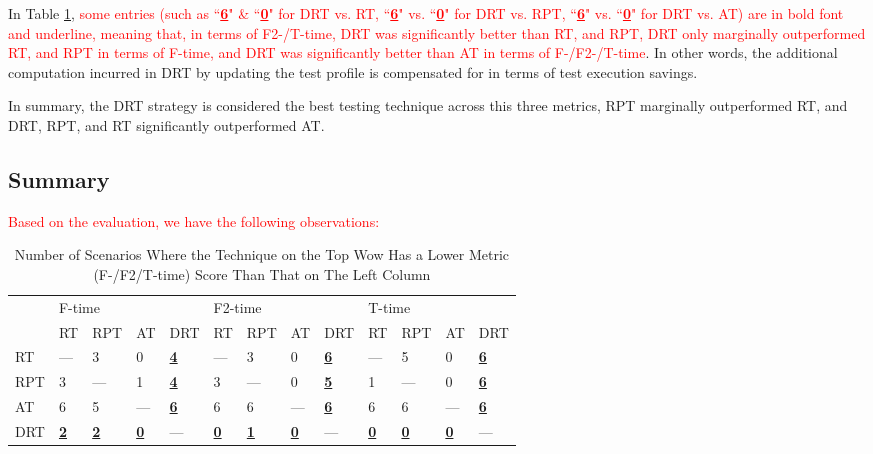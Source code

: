 \documentclass[10pt,journal,compsoc]{IEEEtran}
\begin{document}
In Table \ref{tableHlom:f/f2/t-time}, \textcolor{red}{some entries (such as ``\underline{\textbf{6}}" \& ``\underline{\textbf{0}}" for DRT vs. RT, ``\underline{\textbf{6}}" vs. ``\underline{\textbf{0}}" for DRT vs. RPT, ``\underline{\textbf{6}}" vs. ``\underline{\textbf{0}}" for DRT vs. AT) are in bold font and underline, meaning that, in terms of F2-/T-time, DRT was significantly better than RT, and RPT, DRT only marginally outperformed RT, and RPT in terms of F-time, and DRT was significantly better than AT in terms of F-/F2-/T-time}.
In other words, the additional computation incurred in DRT by updating the test profile is compensated for in terms of test execution savings.

In summary, the DRT strategy is considered the best testing technique across this three metrics, RPT marginally outperformed RT, and DRT, RPT, and RT significantly outperformed AT.

\subsection{Summary}
\label{sec:summary}
\textcolor{red}{Based on the evaluation, we have the following observations:}

\begin{table}
  \caption{Number of Scenarios Where the Technique on the Top Wow Has a Lower Metric (F-/F2/T-time) Score Than That on The Left Column}
  \centering
  \label{tableHlom:f/f2/t-time}
  \begin{tabular}{lllllllllllll}  \toprule
  \multirow{2}{*}{}&\multicolumn{4}{l}{F-time}&\multicolumn{4}{l}{F2-time}&\multicolumn{4}{l}{T-time}\\\cmidrule(lr){2-5}\cmidrule(lr){6-9}
  \cmidrule(lr){10-13}
     &\!RT\! &\!RPT\! &\!AT\!&\!DRT\!                &\!RT\!&\!RPT\!&\!AT\!&\!DRT\!              &\!RT\!&\!RPT\!&\!AT\!&\!DRT\!\\\midrule
  RT & ---   &3       &0     &\underline{\textbf{4}}& ---  &3      &0&\underline{\textbf{6}} &--- &5  &0   &\underline{\textbf{6}}  \\
  RPT&3      & ---    &1     &\underline{\textbf{4}}&3     & ---   &0 &\underline{\textbf{5}}  &1 &---&0   &\underline{\textbf{6}} \\
  AT &6      &5       &---   &\underline{\textbf{6}}&6     &6      &--- &\underline{\textbf{6}}&6 &6 &---&\underline{\textbf{6}}    \\
  DRT&\underline{\textbf{2}}&\underline{\textbf{2}}&\underline{\textbf{0}}&---&\underline{\textbf{0}} &\underline{\textbf{1}}&\underline{\textbf{0}} &--- &\underline{\textbf{0}}  &\underline{\textbf{0}}&\underline{\textbf{0}} & ---  \\ \bottomrule
  \end{tabular}
\end{table}
\end{document}
